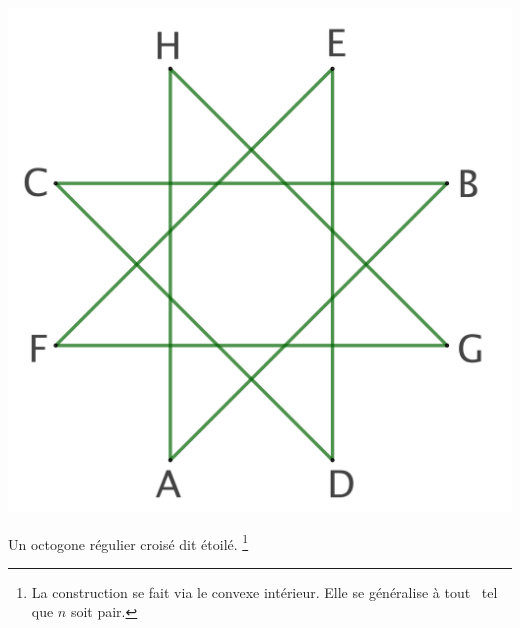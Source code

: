 \begin{remark}
\begin{multicols}{2}
    	\columnbreak
	
	    \null\vfill
	    
	    \includegraphics[scale=.3]{content/polygon/def/8-iso-non-conv.png}
    
        \smallskip
        Un octogone régulier croisé dit étoilé.%
	    \footnote{
	        La construction se fait via le  convexe intérieur. Elle se généralise à tout \nreg\ tel que $n$ soit pair.
	    }

    \end{multicols}
\end{remark}
